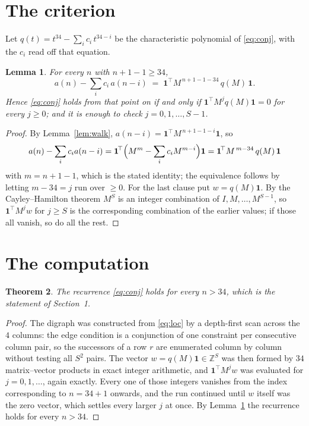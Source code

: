 \documentclass[11pt,a4paper]{article}
\theoremstyle{plain}
\newtheorem{theorem}{Theorem}
\newtheorem{lemma}[theorem]{Lemma}
\theoremstyle{definition}
\begin{document}
\section{The criterion}

Let $q(t)=t^{34}-\sum_i c_i\,t^{34-i}$ be the characteristic polynomial of
\eqref{eq:conj}, with the $c_i$ read off that equation.

\begin{lemma}\label{lem:crit}
For every $n$ with $n+1-1\ge34$,
\[
a(n)-\sum_i c_i\,a(n-i)\;=\;\mathbf{1}^{\!\top}M^{\,n+1-1-34}\,q(M)\,\mathbf{1} .
\]
Hence \eqref{eq:conj} holds from that point on if and only if
$\mathbf{1}^{\!\top}M^{j}q(M)\mathbf{1}=0$ for every $j\ge0$; and it is enough to check
$j=0,1,\dots,S-1$.
\end{lemma}

\begin{proof}
By Lemma~\ref{lem:walk}, $a(n-i)=\mathbf{1}^{\!\top}M^{\,n+1-1-i}\mathbf{1}$, so
\[
a(n)-\sum_i c_i a(n-i)
=\mathbf{1}^{\!\top}\Bigl(M^{m}-\sum_i c_i M^{m-i}\Bigr)\mathbf{1}
=\mathbf{1}^{\!\top}M^{\,m-34}\,q(M)\,\mathbf{1}
\]
with $m=n+1-1$, which is the stated identity; the equivalence follows by letting
$m-34=j$ run over $\ge0$. For the last clause put $w=q(M)\mathbf{1}$. By the
Cayley--Hamilton theorem $M^{S}$ is an integer combination of $I,M,\dots,M^{S-1}$, so
$\mathbf{1}^{\!\top}M^{j}w$ for $j\ge S$ is the corresponding combination of the earlier
values; if those all vanish, so do all the rest.
\end{proof}

\section{The computation}

\begin{theorem}
The recurrence \eqref{eq:conj} holds for every $n>34$, which is the statement of
Section~1.
\end{theorem}

\begin{proof}
The digraph was constructed from \eqref{eq:loc} by a depth-first scan across the $4$
columns: the edge condition is a conjunction of one constraint per consecutive column
pair, so the successors of a row $r$ are enumerated column by column without testing all
$S^2$ pairs. The vector $w=q(M)\mathbf{1}\in\mathbb{Z}^{S}$ was then formed by $34$
matrix--vector products in exact integer arithmetic, and $\mathbf{1}^{\!\top}M^{j}w$ was
evaluated for $j=0,1,\dots$, again exactly. Every one of those integers vanishes from the
index corresponding to $n=34+1$ onwards, and the run continued until $w$ itself was the
zero vector, which settles every larger $j$ at once. By Lemma~\ref{lem:crit} the recurrence
holds for every $n>34$.
\end{proof}
\end{document}
